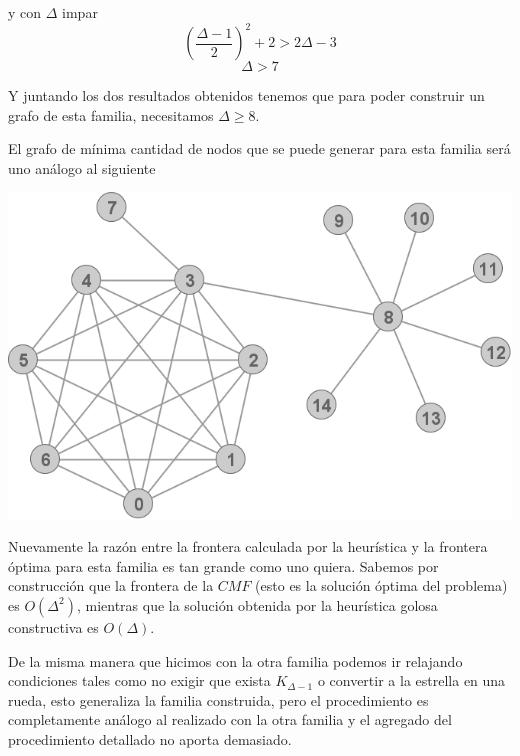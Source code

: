 y con $\Delta$ impar
\[ (\frac{\Delta -1}{2})^2 + 2 > 2 \Delta -3 \]
\[ \Delta > 7 \]

Y juntando los dos resultados obtenidos tenemos que para poder construir un 
grafo de esta familia, necesitamos $\Delta \geq 8 $.

El grafo de m\'inima cantidad de nodos que se puede generar para esta 
familia ser\'a uno an\'alogo al siguiente
\begin{center} 
	\includegraphics[scale = 0.3]{img/ej3/constructiva_golosa/estrellaCMF_st0.png} 
\end{center}

Nuevamente la raz\'on entre la frontera calculada por la heur\'istica y la frontera 
\'optima para esta familia es tan grande como uno quiera. Sabemos por construcci\'on 
que la frontera de la $CMF$ (esto es la soluci\'on \'optima del problema) es 
$O(\Delta^2)$, mientras que la soluci\'on obtenida por la heur\'istica golosa 
constructiva es $O(\Delta)$.

De la misma manera que hicimos con la otra familia podemos ir relajando condiciones
tales como no exigir que exista $K_{\Delta -1}$ o convertir a la estrella en una rueda, 
esto generaliza la familia construida, pero el procedimiento es completamente an\'alogo
al realizado con la otra familia y el agregado del procedimiento detallado no aporta 
demasiado.

